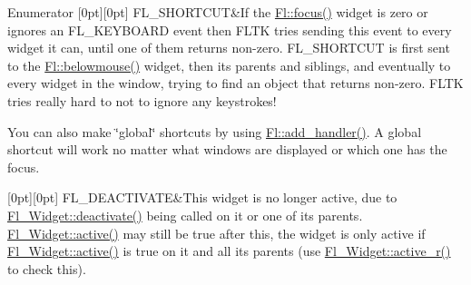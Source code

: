 \begin{DoxyEnumFields}{Enumerator}
[0pt][0pt]{}\mbox{\label{_enumerations_8_h_ad16daf120d9a0501cccaee563af0b9a3a6161f0e91cc6b2947200323e3bda8156}} 
F\+L\+\_\+\+S\+H\+O\+R\+T\+C\+UT&If the \hyperlink{group__fl__events_ga7f0e9836db43268979e0b3a999583b7f}{Fl\+::focus()} widget is zero or ignores an F\+L\+\_\+\+K\+E\+Y\+B\+O\+A\+RD event then F\+L\+TK tries sending this event to every widget it can, until one of them returns non-\/zero. F\+L\+\_\+\+S\+H\+O\+R\+T\+C\+UT is first sent to the \hyperlink{group__fl__events_ga5b55ce634002a2743c24c4c4db7cbdd4}{Fl\+::belowmouse()} widget, then its parents and siblings, and eventually to every widget in the window, trying to find an object that returns non-\/zero. F\+L\+TK tries really hard to not to ignore any keystrokes!

You can also make \char`\"{}global\char`\"{} shortcuts by using \hyperlink{group__fl__events_ga04759d795ad0df6d5ee19e82aa92b3ec}{Fl\+::add\+\_\+handler()}. A global shortcut will work no matter what windows are displayed or which one has the focus. \\
\hline

[0pt][0pt]{}\mbox{\label{_enumerations_8_h_ad16daf120d9a0501cccaee563af0b9a3ad9fd8e3ac1c8c3533f73205e450af9d3}} 
F\+L\+\_\+\+D\+E\+A\+C\+T\+I\+V\+A\+TE&This widget is no longer active, due to \hyperlink{class_fl___widget_a2eb3d2eebe8ba623c4007d4f8e66a1ee}{Fl\+\_\+\+Widget\+::deactivate()} being called on it or one of its parents. \hyperlink{class_fl___widget_ae10c2f227e76414e8142808eeda23c0c}{Fl\+\_\+\+Widget\+::active()} may still be true after this, the widget is only active if \hyperlink{class_fl___widget_ae10c2f227e76414e8142808eeda23c0c}{Fl\+\_\+\+Widget\+::active()} is true on it and all its parents (use \hyperlink{class_fl___widget_a25ebd158cb9f7ccfa7b4cf3406c2b603}{Fl\+\_\+\+Widget\+::active\+\_\+r()} to check this). \\
\hline


\end{DoxyEnumFields}
